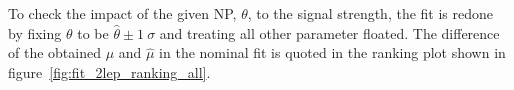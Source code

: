 
To check the impact of the given NP, $\theta$, to the signal strength, the fit is redone by fixing $\theta$ to be $\hat{\theta} \pm 1~\sigma$ and treating all other parameter floated. The difference of the obtained $\mu$ and $\hat{\mu}$ in the nominal fit is quoted in the ranking plot shown in 
figure~\ref{fig:fit_2lep_ranking_all}. 

